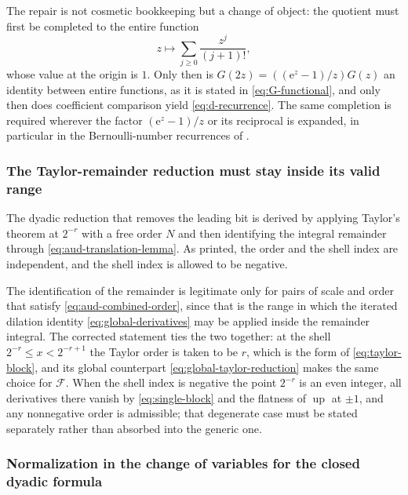 \documentclass[11pt,oneside]{article}
\theoremstyle{definition}
\theoremstyle{remark}
\newcommand{\Up}{\operatorname{up}}
\newcommand{\e}{\mathrm e}
\begin{document}
The repair is not cosmetic bookkeeping but a change of object: the quotient must first be
completed to the entire function
\begin{equation}
 z\longmapsto\sum_{j\ge0}\frac{z^{j}}{(j+1)!},
                                                          \label{eq:aud-entire-quotient}
\end{equation}
whose value at the origin is $1$.  Only then is $G(2z)=((\e^{z}-1)/z)G(z)$ an identity between
entire functions, as it is stated in \eqref{eq:G-functional}, and only then does coefficient
comparison yield \eqref{eq:d-recurrence}.  The same completion is required wherever the
factor $(\e^{z}-1)/z$ or its reciprocal is expanded, in particular in the Bernoulli-number
recurrences of .

\subsubsection{The Taylor-remainder reduction must stay inside its valid range}

The dyadic reduction that removes the leading bit is derived by applying Taylor's theorem at
$2^{-r}$ with a free order $N$ and then identifying the integral remainder through
\eqref{eq:aud-translation-lemma}.  As printed, the order and the shell index are
independent, and the shell index is allowed to be negative.

The identification of the remainder is legitimate only for pairs of scale and order that
satisfy \eqref{eq:aud-combined-order}, since that is the range in which the iterated dilation
identity \eqref{eq:global-derivatives} may be applied inside the remainder integral.  The
corrected statement ties the two together: at the shell $2^{-r}\le x<2^{-r+1}$ the Taylor
order is taken to be $r$, which is the form of \eqref{eq:taylor-block}, and its global
counterpart \eqref{eq:global-taylor-reduction} makes the same choice for $\mathcal F$.  When
the shell index is negative the point $2^{-r}$ is an even integer, all derivatives there
vanish by \eqref{eq:single-block} and the flatness of $\Up$ at $\pm1$, and any nonnegative
order is admissible; that degenerate case must be stated separately rather than absorbed
into the generic one.

\subsubsection{Normalization in the change of variables for the closed dyadic formula}
\end{document}

